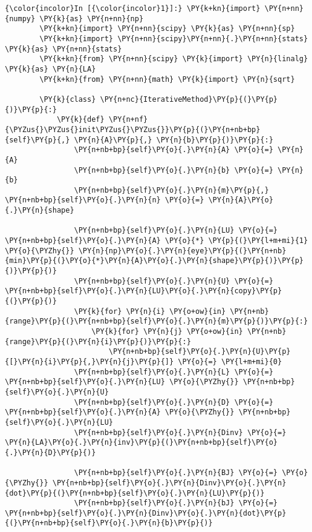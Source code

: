     \begin{Verbatim}[commandchars=\\\{\}]
{\color{incolor}In [{\color{incolor}1}]:} \PY{k+kn}{import} \PY{n+nn}{numpy} \PY{k}{as} \PY{n+nn}{np}
        \PY{k+kn}{import} \PY{n+nn}{scipy} \PY{k}{as} \PY{n+nn}{sp}
        \PY{k+kn}{import} \PY{n+nn}{scipy}\PY{n+nn}{.}\PY{n+nn}{stats} \PY{k}{as} \PY{n+nn}{stats}
        \PY{k+kn}{from} \PY{n+nn}{scipy} \PY{k}{import} \PY{n}{linalg} \PY{k}{as} \PY{n}{LA}
        \PY{k+kn}{from} \PY{n+nn}{math} \PY{k}{import} \PY{n}{sqrt}
        
        \PY{k}{class} \PY{n+nc}{IterativeMethod}\PY{p}{(}\PY{p}{)}\PY{p}{:}
            \PY{k}{def} \PY{n+nf}{\PYZus{}\PYZus{}init\PYZus{}\PYZus{}}\PY{p}{(}\PY{n+nb+bp}{self}\PY{p}{,} \PY{n}{A}\PY{p}{,} \PY{n}{b}\PY{p}{)}\PY{p}{:}
                \PY{n+nb+bp}{self}\PY{o}{.}\PY{n}{A} \PY{o}{=} \PY{n}{A}
                \PY{n+nb+bp}{self}\PY{o}{.}\PY{n}{b} \PY{o}{=} \PY{n}{b}
                \PY{n+nb+bp}{self}\PY{o}{.}\PY{n}{m}\PY{p}{,} \PY{n+nb+bp}{self}\PY{o}{.}\PY{n}{n} \PY{o}{=} \PY{n}{A}\PY{o}{.}\PY{n}{shape}
                
                \PY{n+nb+bp}{self}\PY{o}{.}\PY{n}{LU} \PY{o}{=} \PY{n+nb+bp}{self}\PY{o}{.}\PY{n}{A} \PY{o}{*} \PY{p}{(}\PY{l+m+mi}{1} \PY{o}{\PYZhy{}} \PY{n}{np}\PY{o}{.}\PY{n}{eye}\PY{p}{(}\PY{n+nb}{min}\PY{p}{(}\PY{o}{*}\PY{n}{A}\PY{o}{.}\PY{n}{shape}\PY{p}{)}\PY{p}{)}\PY{p}{)}
                \PY{n+nb+bp}{self}\PY{o}{.}\PY{n}{U} \PY{o}{=} \PY{n+nb+bp}{self}\PY{o}{.}\PY{n}{LU}\PY{o}{.}\PY{n}{copy}\PY{p}{(}\PY{p}{)}
                \PY{k}{for} \PY{n}{i} \PY{o+ow}{in} \PY{n+nb}{range}\PY{p}{(}\PY{n+nb+bp}{self}\PY{o}{.}\PY{n}{m}\PY{p}{)}\PY{p}{:}
                    \PY{k}{for} \PY{n}{j} \PY{o+ow}{in} \PY{n+nb}{range}\PY{p}{(}\PY{n}{i}\PY{p}{)}\PY{p}{:}
                        \PY{n+nb+bp}{self}\PY{o}{.}\PY{n}{U}\PY{p}{[}\PY{n}{i}\PY{p}{,}\PY{n}{j}\PY{p}{]} \PY{o}{=} \PY{l+m+mi}{0}
                \PY{n+nb+bp}{self}\PY{o}{.}\PY{n}{L} \PY{o}{=} \PY{n+nb+bp}{self}\PY{o}{.}\PY{n}{LU} \PY{o}{\PYZhy{}} \PY{n+nb+bp}{self}\PY{o}{.}\PY{n}{U}
                \PY{n+nb+bp}{self}\PY{o}{.}\PY{n}{D} \PY{o}{=} \PY{n+nb+bp}{self}\PY{o}{.}\PY{n}{A} \PY{o}{\PYZhy{}} \PY{n+nb+bp}{self}\PY{o}{.}\PY{n}{LU}
                \PY{n+nb+bp}{self}\PY{o}{.}\PY{n}{Dinv} \PY{o}{=} \PY{n}{LA}\PY{o}{.}\PY{n}{inv}\PY{p}{(}\PY{n+nb+bp}{self}\PY{o}{.}\PY{n}{D}\PY{p}{)}
                
                \PY{n+nb+bp}{self}\PY{o}{.}\PY{n}{BJ} \PY{o}{=} \PY{o}{\PYZhy{}} \PY{n+nb+bp}{self}\PY{o}{.}\PY{n}{Dinv}\PY{o}{.}\PY{n}{dot}\PY{p}{(}\PY{n+nb+bp}{self}\PY{o}{.}\PY{n}{LU}\PY{p}{)}
                \PY{n+nb+bp}{self}\PY{o}{.}\PY{n}{bJ} \PY{o}{=} \PY{n+nb+bp}{self}\PY{o}{.}\PY{n}{Dinv}\PY{o}{.}\PY{n}{dot}\PY{p}{(}\PY{n+nb+bp}{self}\PY{o}{.}\PY{n}{b}\PY{p}{)}
        

\end{Verbatim}
